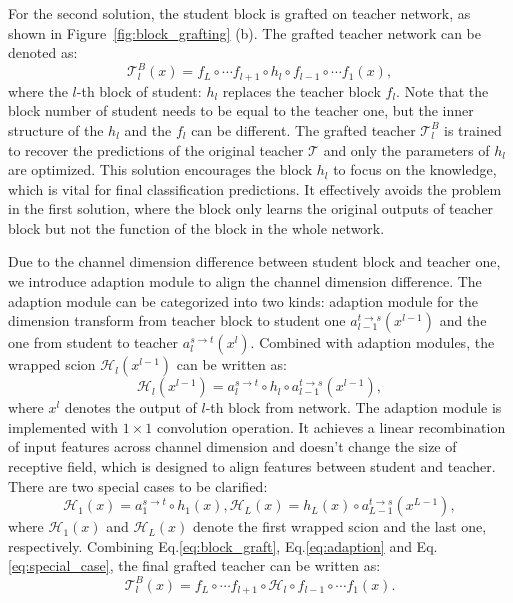 \documentclass[letterpaper]{article} %
\begin{document}
{{        For the second solution, the student block is grafted on teacher network, as shown in Figure~\ref{fig:block_grafting} (b).
        The grafted teacher network can be denoted as:
        \begin{equation} \label{eq:block_graft}
            \mathcal{T}_l^B(x) = f_L \circ \cdots f_{l+1} \circ h_l \circ f_{l-1} \circ \cdots f_1(x),
        \end{equation}
        where the $l$-th block of student: $h_l$ replaces the teacher block $f_l$.
        Note that the block number of student needs to be equal to the teacher one, but the inner structure of the $h_l$ and the $f_l$ can be different.
        The grafted teacher $\mathcal{T}_l^B$ is trained to recover the predictions of the original teacher $\mathcal{T}$ and only the parameters of $h_l$ are optimized.
        This solution encourages the block $h_l$ to focus on the knowledge, which is vital for final classification predictions.
        It effectively avoids the problem in the first solution, where the block only learns the original outputs of teacher block but not the function of the block in the whole network.

        Due to the channel dimension difference between student block and teacher one, we introduce adaption module to align the channel dimension difference.
        The adaption module can be categorized into two kinds: adaption module for the dimension transform from teacher block to student one $a_{l-1}^{t \rightarrow s}(x^{l-1})$ and the one from student to teacher $a_{l}^{s \rightarrow t}(x^{l})$.
        Combined with adaption modules, the wrapped scion $\mathcal{H}_l(x^{l-1})$ can be written as:
        \begin{equation} \label{eq:adaption}
            \mathcal{H}_l(x^{l-1}) = a_{l}^{s \rightarrow t}\circ h_l \circ a_{l-1}^{t \rightarrow s}(x^{l-1}), 
        \end{equation}
        where $x^l$ denotes the output of $l$-th block from network.
        The adaption module is implemented with $1 \times 1$ convolution operation.
        It achieves a linear recombination of input features across channel dimension and doesn't change the size of receptive field, which is designed to align features between student and teacher.
        There are two special cases to be clarified: 
        \begin{equation} \label{eq:special_case}
            \mathcal{H}_1(x) = a_{1}^{s \rightarrow t}\circ h_1(x), 
            \mathcal{H}_L(x) = h_L(x) \circ a_{L-1}^{t \rightarrow s}(x^{L-1}), 
        \end{equation}
        where $\mathcal{H}_1(x)$ and $\mathcal{H}_L(x)$ denote the first wrapped scion and the last one, respectively.
        Combining Eq.\ref{eq:block_graft}, Eq.\ref{eq:adaption} and Eq.\ref{eq:special_case}, the final grafted teacher can be written as:
        \begin{equation} \label{eq:final_block_graft}
            \mathcal{T}_l^B(x) = f_L \circ \cdots f_{l+1} \circ \mathcal{H}_l \circ f_{l-1} \circ \cdots f_1(x).
        \end{equation}

}}
\end{document}
